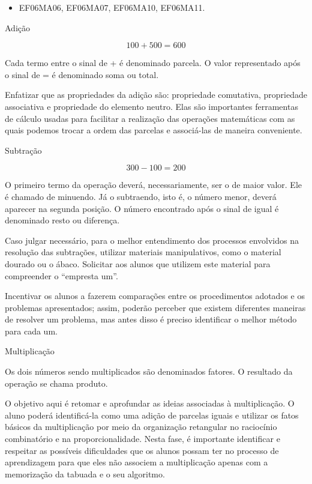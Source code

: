 \begin{itemize} 
\item  EF06MA06, EF06MA07, EF06MA10, EF06MA11.
\end{itemize}

Adição

$$100 + 500 = 600$$

Cada termo entre o sinal de + é denominado parcela. O valor representado
após o sinal de = é denominado soma ou total.

Enfatizar que as propriedades da adição são: propriedade comutativa,
propriedade associativa e propriedade do elemento neutro. Elas são
importantes ferramentas de cálculo usadas para facilitar a realização
das operações matemáticas com as quais podemos trocar a ordem das
parcelas e associá-las de maneira conveniente.

Subtração


$$300 - 100 = 200$$

O primeiro termo da operação deverá, necessariamente, ser o de maior
valor. Ele é chamado de minuendo. Já o subtraendo, isto é, o número
menor, deverá aparecer na segunda posição. O número encontrado após o
sinal de igual é denominado resto ou diferença.

Caso julgar necessário, para o melhor entendimento dos processos
envolvidos na resolução das subtrações, utilizar materiais
manipulativos, como o material dourado ou o ábaco. Solicitar aos alunos
que utilizem este material para compreender o ``empresta um''.

Incentivar os alunos a fazerem comparações entre os procedimentos
adotados e os problemas apresentados; assim, poderão perceber que
existem diferentes maneiras de resolver um problema, mas antes disso é
preciso identificar o melhor método para cada um.

Multiplicação


Os dois números sendo multiplicados são denominados fatores. O resultado
da operação se chama produto.

O objetivo aqui é retomar e aprofundar as ideias associadas à
multiplicação. O aluno poderá identificá-la como uma adição de parcelas
iguais e utilizar os fatos básicos da multiplicação por meio da
organização retangular no raciocínio combinatório e na
proporcionalidade. Nesta fase, é importante identificar e respeitar as
possíveis dificuldades que os alunos possam ter no processo de
aprendizagem para que eles não associem a multiplicação apenas com a
memorização da tabuada e o seu algoritmo.

